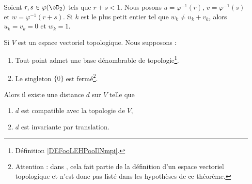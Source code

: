 \begin{lemma}       \label{LEMooQYILooMimKHS}
    Soient \( r,s\in \varphi(\eD_2)\) tels que \( r+s<1\). Nous posons \( u=\varphi^{-1}(r)\), \( v=\varphi^{-1}(s)\) et \( w=\varphi^{-1}(r+s)\). Si \(k \) est le plus petit entier tel que \( w_k\neq u_k+v_k\), alors \( u_k=v_k=0\) et \( w_k=1\).
\end{lemma}

\begin{theorem}      \label{THOooAGBXooZnvQLK}
    Si $V$ est un espace vectoriel topologique. Nous supposons :
    \begin{enumerate}
        \item
            Tout point admet une base dénombrable de topologie\footnote{Définition \ref{DEFooLEHPooIlNmpi}.}.
        \item
            Le singleton \( \{ 0 \}\) est fermé\footnote{Attention : dans \cite{ooMKWJooLSkGfh}, cela fait partie de la définition d'un espace vectoriel topologique et n'est donc pas listé dans les hypothèses de ce théorème.}.
    \end{enumerate}
    Alors il existe une distance \( d\) sur \( V\) telle que
    \begin{enumerate}
        \item
            \( d\) est compatible avec la topologie de \( V\),
        \item
            \( d\) est invariante par translation.
    \end{enumerate}
\end{theorem}

